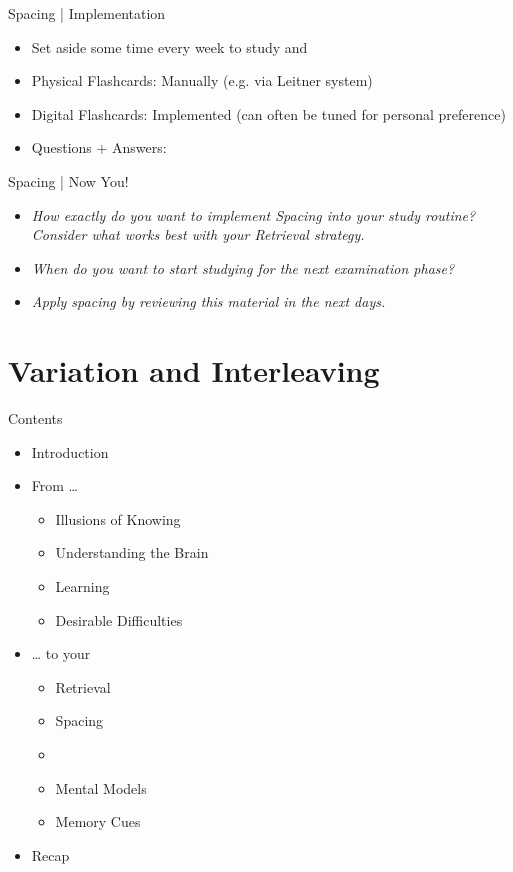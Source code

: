 \documentclass{ercisbeamer}
\begin{document}
\begin{frame}{Spacing | Implementation}
    \begin{itemize}
        \item Set aside some time every week  to study and 
        \item Physical Flashcards: Manually (e.g. via Leitner system)
        \item Digital Flashcards: Implemented  (can often be tuned for personal preference)
        \item Questions + Answers: 
    \end{itemize}
\end{frame}

\begin{frame}{Spacing | Now You!}
    \begin{itemize}
        \item \emph{How exactly do you want to implement Spacing into your study routine? \\ Consider what works best with your Retrieval strategy.}
        \item \emph{When do you want to start studying for the next examination phase?}
        \item \emph{Apply spacing by reviewing this material in the next days.}
    \end{itemize}
\end{frame}

\section{Variation and Interleaving}
\begin{frame}{Contents}
    \begin{itemize}
        \item Introduction
        \item From …
        \begin{itemize}
            \item Illusions of Knowing
            \item Understanding the Brain
            \item Learning
            \item Desirable Difficulties
        \end{itemize}
        \item … to your 
        \begin{itemize}
            \item Retrieval
            \item Spacing
            \item {}
            \item Mental Models
            \item Memory Cues
        \end{itemize}
        \item Recap
    \end{itemize}
\end{frame}
\end{document}
